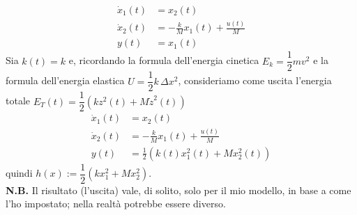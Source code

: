 \documentclass{article}
\begin{document}
\begin{align*}
    \dot x_1(t) &= x_2(t)\\
    \dot x_2(t) &= -\frac{k}{M} x_1(t) + \frac{u(t)}{M}\\
    y(t) &= x_1(t)
\end{align*}
Sia $k(t) = k$ e, ricordando la formula dell'energia cinetica $E_{k}={\dfrac {1}{2}}mv^{2}$ e la formula dell'energia elastica $U={\dfrac {1}{2}}k\,\Delta x^{2}$, consideriamo come uscita l'energia totale $E_T (t) = \dfrac{1}{2} (k z^2 (t) + M \dot z^2 (t))$
\begin{align*}
    \dot x_1(t) &= x_2(t)\\
    \dot x_2(t) &= -\frac{k}{M} x_1(t) + \frac{u(t)}{M}\\
    y(t) &= \frac{1}{2} \left(k(t) x_1^2 (t) + M  x_2^2 (t)\right)
\end{align*}
quindi $h(x):= \dfrac{1}{2} (kx_1^2 + Mx_2^2)$.\\
\textbf{N.B.} Il risultato (l'uscita) vale, di solito, solo per il mio modello, in base a come l'ho impostato; nella realtà potrebbe essere diverso.
\end{document}
